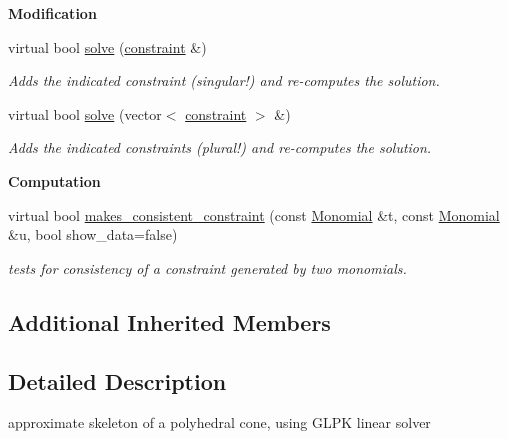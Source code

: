 \begin{Indent}\textbf{ Modification}\par
\begin{DoxyCompactItemize}
\item 
virtual bool \hyperlink{class_g_l_p_k___solver_acb3a10f3961c65b4cf23ff61f0e2310b}{solve} (\hyperlink{classconstraint}{constraint} \&)
\begin{DoxyCompactList}\small\item\em Adds the indicated constraint (singular!) and re-\/computes the solution. \end{DoxyCompactList}\item 
virtual bool \hyperlink{class_g_l_p_k___solver_a6d800f0ec270c782e3cf855aa7f59f4c}{solve} (vector$<$ \hyperlink{classconstraint}{constraint} $>$ \&)
\begin{DoxyCompactList}\small\item\em Adds the indicated constraints (plural!) and re-\/computes the solution. \end{DoxyCompactList}\end{DoxyCompactItemize}
\end{Indent}
\begin{Indent}\textbf{ Computation}\par
\begin{DoxyCompactItemize}
\item 
\mbox{\label{class_g_l_p_k___solver_ad79040934b5bf246b24aa36f30403dce}} 
virtual bool \hyperlink{class_g_l_p_k___solver_ad79040934b5bf246b24aa36f30403dce}{makes\+\_\+consistent\+\_\+constraint} (const \hyperlink{class_monomial}{Monomial} \&t, const \hyperlink{class_monomial}{Monomial} \&u, bool show\+\_\+data=false)
\begin{DoxyCompactList}\small\item\em tests for consistency of a constraint generated by two monomials. \end{DoxyCompactList}\end{DoxyCompactItemize}
\end{Indent}
\subsection*{Additional Inherited Members}


\subsection{Detailed Description}
approximate skeleton of a polyhedral cone, using G\+L\+PK linear solver 

